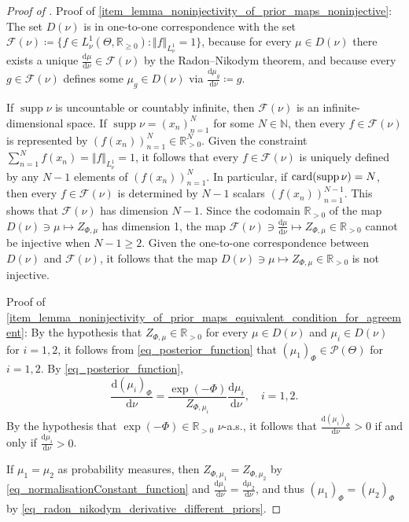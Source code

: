 \documentclass[a4paper]{scrartcl}
\theoremstyle{definition}
\numberwithin{equation}{section}
\newcommand{\R}{\mathbb{R}}
\newcommand{\N}{\mathbb{N}}
\newcommand{\rd}{\mathrm{d}}
\newcommand{\card}[1]{\textup{card}({#1})}
\DeclareMathOperator{\supp}{supp}
\newcommand{\norm}[1]{\Vert #1 \Vert}
\begin{document}
\LemmaNoninjectivityPriorMaps*
\begin{proof}[Proof of ]
 Proof of \cref{item_lemma_noninjectivity_of_prior_maps_noninjective}: The set $D(\nu)$ is in one-to-one correspondence with the set $\mathcal{F}(\nu)\coloneqq \{f\in L^1_\nu(\Theta,\R_{\geq 0}) : \norm{f}_{L^1_\nu}=1\}$, because for every $\mu\in D(\nu)$ there exists a unique $\tfrac{\rd\mu}{\rd\nu}\in \mathcal{F}(\nu)$ by the Radon--Nikodym theorem, and because every $g\in\mathcal{F}(\nu)$ defines some $\mu_g\in D(\nu)$ via $\tfrac{\rd \mu_g}{\rd\nu}\coloneqq g$. 
 
 If $\supp{\nu}$ is uncountable or countably infinite, then $\mathcal{F}(\nu)$ is an infinite-dimensional space. 
 If $\supp{\nu}=(x_n)_{n=1}^N$ for some $N\in\N$, then every $f\in\mathcal{F}(\nu)$ is represented by $(f(x_n))_{n=1}^{N}\in\R_{> 0}^{N}$. 
 Given the constraint $\sum_{n=1}^{N} f(x_n)=\norm{f}_{L^1_\nu}=1$, it follows that every $f\in\mathcal{F}(\nu)$ is uniquely defined by any $N-1$ elements of $(f(x_n))_{n=1}^{N}$.  
 In particular, if $\card{\supp{\nu}}=N$, then every $f\in\mathcal{F}(\nu)$ is determined by $N-1$ scalars $(f(x_n))_{n=1}^{N-1}$. This shows that $\mathcal{F}(\nu)$ has dimension $N-1$.
 Since the codomain $\R_{>0}$ of the map $D(\nu)\ni \mu\mapsto Z_{\Phi,\mu}$ has dimension 1, the map $\mathcal{F}(\nu)\ni \frac{\rd\mu}{\rd\nu} \mapsto Z_{\Phi,\mu}\in\R_{>0}$ cannot be injective when $N-1\geq 2$.
 Given the one-to-one correspondence between $D(\nu)$ and $\mathcal{F}(\nu)$, it follows that the map $D(\nu)\ni \mu\mapsto Z_{\Phi,\mu}\in\R_{>0}$ is not injective.

 Proof of \cref{item_lemma_noninjectivity_of_prior_maps_equivalent_condition_for_agreement}: By the hypothesis that $Z_{\Phi,\mu}\in\R_{>0}$ for every $\mu\in D(\nu)$ and $\mu_i\in D(\nu)$ for $i=1,2$, it follows from \eqref{eq_posterior_function} that $(\mu_1)_\Phi\in\mathcal{P}(\Theta)$ for $i=1,2$.
 By \eqref{eq_posterior_function},
   \begin{equation}
  \label{eq_radon_nikodym_derivative_different_priors}
  \frac{\rd (\mu_i)_\Phi}{\rd \nu}=\frac{\exp(-\Phi)}{Z_{\Phi,\mu_i}}\frac{\rd \mu_i}{\rd \nu},\quad i=1,2.
 \end{equation}
 By the hypothesis that $\exp(-\Phi)\in\R_{>0}$ $\nu$-a.s., it follows that $\tfrac{\rd (\mu_i)_\Phi}{\rd \nu}>0$ if and only if $\tfrac{\rd \mu_i}{\rd \nu}>0$.
 
 If $\mu_1=\mu_2$ as probability measures, then $Z_{\Phi,\mu_1}=Z_{\Phi,\mu_2}$ by \eqref{eq_normalisationConstant_function} and $\tfrac{\rd\mu_1}{\rd\nu}=\tfrac{\rd\mu_2}{\rd\nu}$, and thus $(\mu_1)_\Phi=(\mu_2)_\Phi$ by \eqref{eq_radon_nikodym_derivative_different_priors}.  
 

\end{proof}
\end{document}
